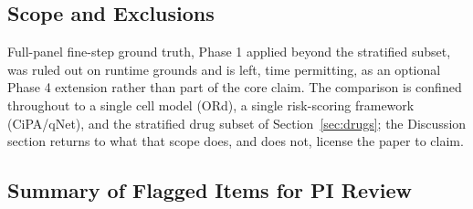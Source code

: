 \documentclass[journal]{IEEEtran}
\begin{document}
\subsection{Scope and Exclusions}

Full-panel fine-step ground truth, Phase 1 applied beyond the stratified subset, was ruled out on runtime grounds and is left, time permitting, as an optional Phase 4 extension rather than part of the core claim. The comparison is confined throughout to a single cell model (ORd), a single risk-scoring framework (CiPA/qNet), and the stratified drug subset of Section~\ref{sec:drugs}; the Discussion section returns to what that scope does, and does not, license the paper to claim.

\subsection*{Summary of Flagged Items for PI Review}
\end{document}
